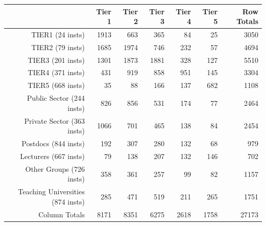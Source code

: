 \begin{tabular}{rrrrrrr}
  \hline
   & \textbf{Tier 1} & \textbf{Tier 2} & \textbf{Tier 3} & \textbf{Tier 4} & \textbf{Tier 5} & \textbf{Row Totals} \\\hline
  TIER1 (24 insts) & 1913 & 663 & 365 & 84 & 25 & 3050 \\
  TIER2 (79 insts) & 1685 & 1974 & 746 & 232 & 57 & 4694 \\
  TIER3 (201 insts) & 1301 & 1873 & 1881 & 328 & 127 & 5510 \\
  TIER4 (371 insts) & 431 & 919 & 858 & 951 & 145 & 3304 \\
  TIER5 (668 insts) & 35 & 88 & 166 & 137 & 682 & 1108 \\
  Public Sector (244 insts) & 826 & 856 & 531 & 174 & 77 & 2464 \\
  Private Sector (363 insts) & 1066 & 701 & 465 & 138 & 84 & 2454 \\
  Postdocs (844 insts) & 192 & 307 & 280 & 132 & 68 & 979 \\
  Lecturers (667 insts) & 79 & 138 & 207 & 132 & 146 & 702 \\
  Other Groups (726 insts) & 358 & 361 & 257 & 99 & 82 & 1157 \\
  Teaching Universities (874 insts) & 285 & 471 & 519 & 211 & 265 & 1751 \\
  Column Totals & 8171 & 8351 & 6275 & 2618 & 1758 & 27173 \\\hline
\end{tabular}
